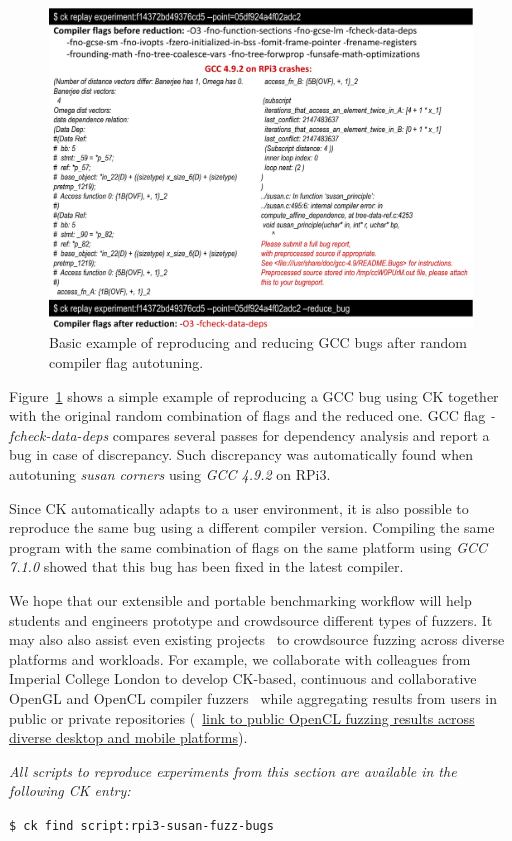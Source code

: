    \begin{figure}[htbp]
     \centering
      \includegraphics[width=5.2in]
      {ck-assets/60e96767e8bd4522-cropped.pdf} %
     \caption{
       Basic example of reproducing and reducing GCC bugs after random compiler flag autotuning.
     }
     \label{fig:ck-trivial-fuzzing-example}
   \end{figure}

Figure~\ref{fig:ck-trivial-fuzzing-example} shows a simple example of reproducing 
a GCC bug using CK together with the original random combination of flags 
and the reduced one.
%
GCC flag \emph{-fcheck-data-deps} compares several passes for dependency analysis
and report a bug in case of discrepancy.
%
Such discrepancy was automatically found when autotuning \emph{susan corners} 
using \emph{GCC 4.9.2} on RPi3.

Since CK automatically adapts to a user environment, it is also possible
to reproduce the same bug using a different compiler version.
%
Compiling the same program with the same combination of flags on the same platform
using \emph{GCC 7.1.0} showed that this bug has been fixed in the latest compiler.

We hope that our extensible and portable benchmarking workflow will help students and engineers 
prototype and crowdsource different types of fuzzers.
It may also also assist even existing projects~\cite{microsoft-fuzz,oss-fuzz}
to crowdsource fuzzing across diverse platforms and workloads.
For example, we collaborate with colleagues from Imperial College London
to develop CK-based, continuous and collaborative OpenGL and OpenCL compiler 
fuzzers~\cite{Lidbury:2015:MCF:2737924.2737986,DBLP:journals/corr/LascuD15,ck-clsmith}
while aggregating results from users in public or private repositories 
(~\href{http://cknowledge.org/repo/web.php?template=cknowledge&wcid=bc0409fb61f0aa82:1b437e72c74fe782&table_sort=2}{link to public OpenCL fuzzing results across diverse desktop and mobile platforms}).

\textit{All scripts to reproduce experiments from this section are available in the following CK entry:}

\begin{flushleft}
\texttt{\$ ck find script:rpi3-susan-fuzz-bugs}
\end{flushleft}
